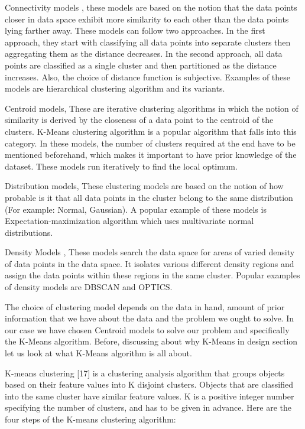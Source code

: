 Connectivity models \cite{doi:10.1093/comjnl/26.4.354}, these models are based on the notion that the data points closer in data space exhibit more similarity to each other than the data points lying farther away. These models can follow two approaches. In the first approach, they start with classifying all data points into separate clusters  then aggregating them as the distance decreases. In the second approach, all data points are classified as a single cluster and then partitioned as the distance increases. Also, the choice of distance function is subjective. Examples of these models are hierarchical clustering algorithm and its variants.

Centroid models, These are iterative clustering algorithms in which the notion of similarity is derived by the closeness of a data point to the centroid of the clusters. K-Means clustering algorithm \cite{Derpanis06k-meansclustering} is a popular algorithm that falls into this category. In these models, the number of clusters required at the end have to be mentioned beforehand, which makes it important to have prior knowledge of the dataset. These models run iteratively to find the local optimum.

Distribution models\cite{Johnson2000}, These clustering models are based on the notion of how probable is it that all data points in the cluster belong to the same distribution (For example: Normal, Gaussian). A popular example of these models is Expectation-maximization algorithm which uses multivariate normal distributions.

Density Models \cite{thang2011anomaly}, These models search the data space for areas of varied density of data points in the data space. It isolates various different density regions and assign the data points within these regions in the same cluster. Popular examples of density models are DBSCAN and OPTICS.

The choice of clustering model depends on the data in hand, amount of prior information that we have about the data and the problem we ought to solve. In our case we have chosen Centroid models to solve our problem and specifically the K-Means algorithm. Before, discussing about why K-Means in design section let us look at what K-Means algorithm is all about.

K-means clustering [17] is a clustering analysis algorithm that groups objects based on their feature values into K disjoint clusters. Objects that are classified into the same cluster have similar feature values. K is a positive integer number specifying the number of clusters, and has to be given in advance. Here are the four steps of the K-means clustering
algorithm:

